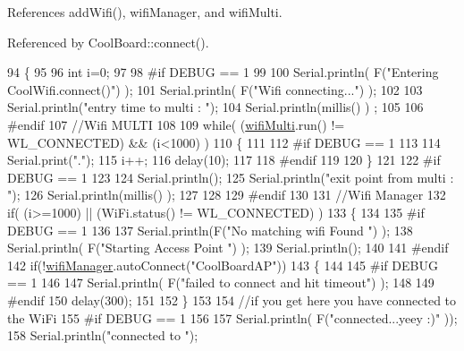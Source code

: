 References add\+Wifi(), wifi\+Manager, and wifi\+Multi.



Referenced by Cool\+Board\+::connect().


\begin{DoxyCode}
94 \{       
95 
96     \textcolor{keywordtype}{int} i=0;
97 
98 \textcolor{preprocessor}{#if DEBUG == 1 }
99 
100     Serial.println( F(\textcolor{stringliteral}{"Entering CoolWifi.connect()"}) );
101     Serial.println( F(\textcolor{stringliteral}{"Wifi connecting..."}) );
102     
103     Serial.println(\textcolor{stringliteral}{"entry time to multi : "});
104     Serial.println(millis() ) ;
105 
106 \textcolor{preprocessor}{#endif}
107     \textcolor{comment}{//Wifi MULTI}
108 
109     \textcolor{keywordflow}{while}( (\hyperlink{classCoolWifi_a7862a8c0d7239877e2956c14a368aab8}{wifiMulti}.run() != WL\_CONNECTED) && (i<1000)  ) 
110     \{
111 
112 \textcolor{preprocessor}{    #if DEBUG == 1}
113 
114             Serial.print(\textcolor{stringliteral}{"."});
115         i++;
116         delay(10);
117     
118 \textcolor{preprocessor}{    #endif}
119 
120         \}   
121 
122 \textcolor{preprocessor}{#if DEBUG == 1 }
123 
124     Serial.println();   
125     Serial.println(\textcolor{stringliteral}{"exit point from multi : "});
126     Serial.println(millis() );
127 
128 
129 \textcolor{preprocessor}{#endif}
130 
131     \textcolor{comment}{//Wifi Manager}
132     \textcolor{keywordflow}{if}( (i>=1000) ||  (WiFi.status() != WL\_CONNECTED) ) 
133     \{
134     
135 \textcolor{preprocessor}{    #if DEBUG == 1 }
136         
137         Serial.println(F(\textcolor{stringliteral}{"No matching wifi Found "}) );
138         Serial.println( F(\textcolor{stringliteral}{"Starting Access Point "}) );  
139         Serial.println();
140     
141 \textcolor{preprocessor}{    #endif}
142         \textcolor{keywordflow}{if}(!\hyperlink{classCoolWifi_a80dd24fdc56e863f5eb9947dd65a433a}{wifiManager}.autoConnect(\textcolor{stringliteral}{"CoolBoardAP"})) 
143         \{
144         
145 \textcolor{preprocessor}{        #if DEBUG == 1}
146 
147             Serial.println( F(\textcolor{stringliteral}{"failed to connect and hit timeout"}) );
148         
149 \textcolor{preprocessor}{        #endif}
150             delay(300);
151 
152         \} 
153 
154           \textcolor{comment}{//if you get here you have connected to the WiFi}
155 \textcolor{preprocessor}{        #if DEBUG == 1}
156 
157             Serial.println( F(\textcolor{stringliteral}{"connected...yeey :)"} ));
158             Serial.println(\textcolor{stringliteral}{"connected to "});

\end{DoxyCode}

